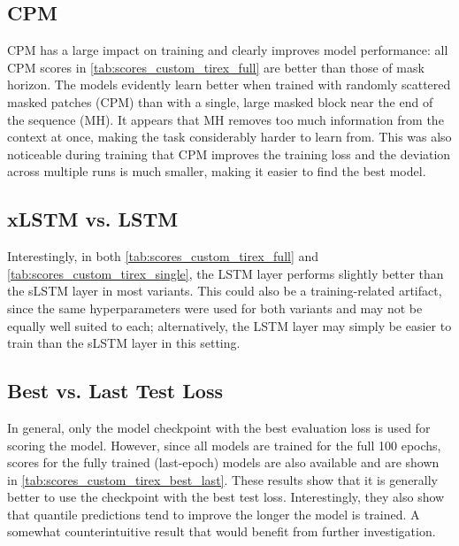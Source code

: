 \documentclass[a4paper,oneside,10pt,ngerman,english]{scrartcl}
\begin{document}
\subsection{CPM}
\label{sec:cpm_results}
CPM has a large impact on training and clearly improves model performance: all CPM scores in \autoref{tab:scores_custom_tirex_full} are better than those of mask horizon. The models evidently learn better when trained with randomly scattered masked patches (CPM) than with a single, large masked block near the end of the sequence (MH). It appears that MH removes too much information from the context at once, making the task considerably harder to learn from. This was also noticeable during training that CPM improves the training loss and the deviation across multiple runs is much smaller, making it easier to find the best model.

\subsection{xLSTM vs. LSTM}
\label{sec:xlstm_vs_lstm_results}
Interestingly, in both \autoref{tab:scores_custom_tirex_full} and \autoref{tab:scores_custom_tirex_single}, the LSTM layer performs slightly better than the sLSTM layer in most variants. This could also be a training-related artifact, since the same hyperparameters were used for both variants and may not be equally well suited to each; alternatively, the LSTM layer may simply be easier to train than the sLSTM layer in this setting.

\subsection{Best vs. Last Test Loss}
\label{sec:best_vs_last_results}
In general, only the model checkpoint with the best evaluation loss is used for scoring the model. However, since all models are trained for the full 100 epochs, scores for the fully trained (last-epoch) models are also available and are shown in \autoref{tab:scores_custom_tirex_best_last}. These results show that it is generally better to use the checkpoint with the best test loss. Interestingly, they also show that quantile predictions tend to improve the longer the model is trained. A somewhat counterintuitive result that would benefit from further investigation.
\end{document}
